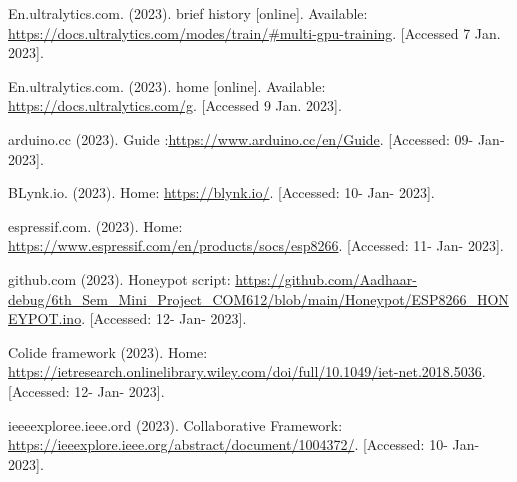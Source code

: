 \documentclass[letterpaper, 10 pt, conference]{ieeeconf}  %
\begin{document}
\begin{thebibliography}{99}

 En.ultralytics.com. (2023). brief history [online]. Available: \url{https://docs.ultralytics.com/modes/train/#multi-gpu-training}. [Accessed 7 Jan. 2023].

 En.ultralytics.com. (2023). home [online]. Available: \url{https://docs.ultralytics.com/g}. [Accessed 9 Jan. 2023].

 arduino.cc (2023). Guide :\url{https://www.arduino.cc/en/Guide}. [Accessed: 09- Jan- 2023].

 BLynk.io. (2023). Home: \url{https://blynk.io/}. [Accessed: 10- Jan- 2023].

 espressif.com. (2023). Home: \url{https://www.espressif.com/en/products/socs/esp8266}. [Accessed: 11- Jan- 2023].

 github.com (2023). Honeypot script: \url{https://github.com/Aadhaar-debug/6th_Sem_Mini_Project_COM612/blob/main/Honeypot/ESP8266_HONEYPOT.ino}. [Accessed: 12- Jan- 2023].

 Colide framework (2023). Home: \url{https://ietresearch.onlinelibrary.wiley.com/doi/full/10.1049/iet-net.2018.5036}. [Accessed: 12- Jan- 2023].

 ieeeexploree.ieee.ord (2023). Collaborative Framework: \url{https://ieeexplore.ieee.org/abstract/document/1004372/}. [Accessed: 10- Jan- 2023].

\end{thebibliography}
\end{document}
